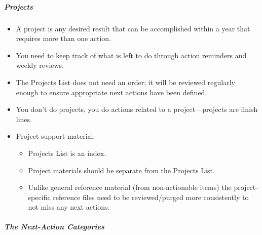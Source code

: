 \documentclass{article}
\begin{document}
\subparagraph{Projects}

\begin{itemize}
  \item A project is any desired result that can be accomplished within a year that requires more than one action.
  \item You need to keep track of what is left to do through action reminders and weekly reviews.
  \item The Projects List does not need an order; it will be reviewed regularly enough to ensure appropriate next actions have been defined.
  \item You don't do projects, you do actions related to a project---projects are finish lines.
  \item Project-support material:
  \begin{itemize}
    \item Projects List is an index.
    \item Project materials should be separate from the Projects List.
    \item Unlike general reference material (from non-actionable items) the project-specific reference files need to be reviewed/purged more consistently to not miss any next actions.
  \end{itemize}
\end{itemize}

\subparagraph{The Next-Action Categories}
\end{document}
